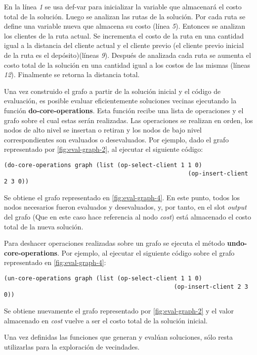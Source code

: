 En la línea \textit{1} se usa def-var para inicializar la variable que almacenará el costo total de la solución. Luego se analizan las rutas de la solución. Por cada ruta se define una variable nueva que almacena su costo (línea \textit{5}). Entonces se analizan los clientes de la ruta actual. Se incrementa el costo de la ruta en una cantidad igual a la distancia del cliente actual y el cliente previo (el cliente previo inicial de la ruta es el depósito)(líneas \textit{9}). Después de analizada cada ruta se aumenta el costo total de la solución en una cantidad igual a los costos de las mismas (líneas \textit{12}). Finalmente se retorna la distancia total.

Una vez construido el grafo a partir de la solución inicial y el código de evaluación, es posible evaluar eficientemente soluciones vecinas ejecutando la función \textbf{do-core-operations}. Esta función recibe una lista de operaciones y el grafo sobre el cual estas serán realizadas. Las operaciones se realizan en orden, los nodos de alto nivel se insertan o retiran y los nodos de bajo nivel correspondientes son evaluados o desevaluados. Por ejemplo, dado el grafo representado por \ref{fig:eval-graph-2}, al ejecutar el siguiente código:

\begin{lstlisting}
(do-core-operations graph (list (op-select-client 1 1 0)
													(op-insert-client 2 3 0))
\end{lstlisting}

Se obtiene el grafo representado en \ref{fig:eval-graph-4}. En este punto, todos los nodos necesarios fueron evaluados y desevaluados, y, por tanto, en el slot \textit{output} del grafo (Que en este caso hace referencia al nodo \textit{cost}) está almacenado el costo total de la nueva solución.

Para deshacer operaciones realizadas sobre un grafo se ejecuta el método \textbf{undo-core-operations}. Por ejemplo, al ejecutar el siguiente código sobre el grafo representado en \ref{fig:eval-graph-4}:

\begin{lstlisting}
(un-core-operations graph (list (op-select-client 1 1 0)
												(op-insert-client 2 3 0))
\end{lstlisting}

Se obtiene nuevamente el grafo representado por \ref{fig:eval-graph-2} y el valor almacenado en \textit{cost} vuelve a ser el costo total de la solución inicial.

Una vez definidas las funciones que generan y evalúan soluciones, sólo resta utilizarlas para la exploración de vecindades.

